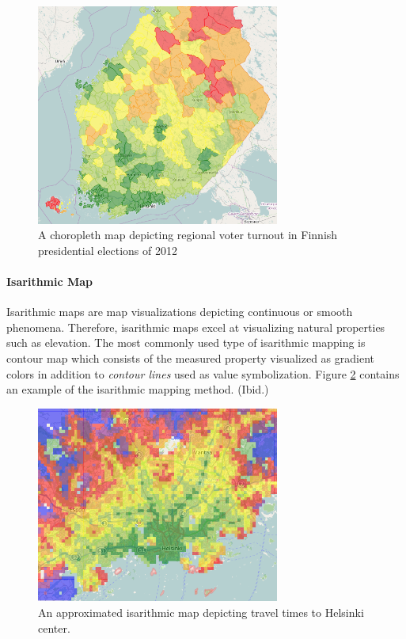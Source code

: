 \begin{figure}[htbp]
  \begin{center}
    \includegraphics[width=8cm]{images/choropleth-example.png}
    \caption{A choropleth map depicting regional voter turnout in Finnish presidential elections of 2012}
    \label{fig:choropleth}
  \end{center}
\end{figure}

\paragraph{Isarithmic Map}

Isarithmic maps are map visualizations depicting continuous or smooth phenomena. Therefore, isarithmic maps excel at visualizing natural properties such as elevation. The most commonly used type of isarithmic mapping is contour map which consists of the measured property visualized as gradient colors in addition to \emph{contour lines} used as value symbolization. Figure \ref{fig:isarithmic} contains an example of the isarithmic mapping method. (Ibid.)

\begin{figure}[htbp]
  \begin{center}
    \includegraphics[width=8cm]{images/isarithmic-example.png}
    \caption{An approximated isarithmic map depicting travel times to Helsinki center.}
    \label{fig:isarithmic}
  \end{center}
\end{figure}

